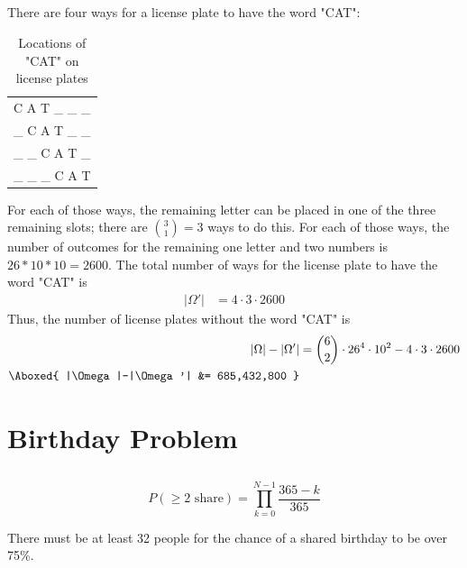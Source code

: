 \documentclass[11pt]{article}
\begin{document}
\subsection{}  %
There are four ways for a license plate to have the word "CAT":
\begin{table}[H]
    \centering{}
    \caption{Locations of "CAT" on license plates}
    \label{1ftab1}
    \begin{tabular}{c}
        \hline\hline
        C A T _ _ _ \\
        _ C A T _ _ \\
        _ _ C A T _ \\
        _ _ _ C A T \\
        \hline\hline
    \end{tabular}
\end{table}
For each of those ways, the remaining letter can be placed in one of the three
remaining slots; there are ${3 \choose 1}=3$ ways to do this. For each of those
ways, the number of outcomes for the remaining one letter and two numbers is
$26 * 10 * 10 = 2600$. The total number of ways for the license plate to have
the word "CAT" is
\begin{align*}
    |\Omega'| &= 4 \cdot 3 \cdot 2600
\end{align*}
Thus, the number of license plates without the word "CAT" is
\begin{align*}
    |\Omega|-|\Omega'| &= {6 \choose 2} \cdot 26^4 \cdot 10^2 - 4 \cdot 3 \cdot 2600 \\
    \Aboxed{
        |\Omega|-|\Omega'| &= 685,432,800
    }
\end{align*}

\section{Birthday Problem}

\subsection{}  %
\begin{equation*}
    P(\geq2 \text{ share}) = \prod_{k=0}^{N-1} \frac{365-k}{365}
\end{equation*}
\begin{mdframed}
    There must be at least 32 people for the chance of a shared birthday to be
    over 75\%.
\end{mdframed}
\end{document}
